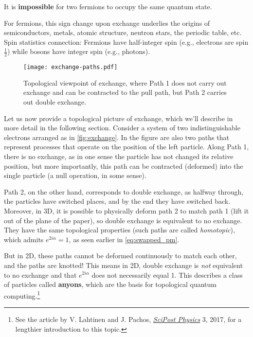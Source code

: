 \documentclass[12pt, english]{book}
\begin{document}
\begin{tcolorbox}[title = Pauli exclusion principle]
	It is \textbf{impossible} for two fermions to occupy the same quantum state.
\end{tcolorbox}

For fermions, this sign change upon exchange underlies the origins of semiconductors, metals, atomic structure, neutron stars, the periodic table, etc.
Spin statistics connection: Fermions have half-integer spin (e.g., electrons are spin $\frac{1}{2}$) while bosons have integer spin (e.g., photons).

\begin{figure}[!ht]
	\centering 
	\texttt{[image: exchange-paths.pdf]}
	\caption{Topological viewpoint of exchange, where Path 1 does not carry out exchange and can be contracted to the pull path, but Path 2 carries out double exchange.}
	\label{fig:exchange}
\end{figure}

Let us now provide a topological picture of exchange, which we'll describe in more detail in the following section.
Consider a system of two indistinguishable electrons arranged as in \autoref{fig:exchange}.
In the figure are also two paths that represent processes that operate on the position of the left particle.
Along Path 1, there is no exchange, as in one sense the particle has not changed its relative position, but more importantly, this path can be contracted (deformed) into the single particle (a null operation, in some sense).

Path 2, on the other hand, corresponds to double exchange, as halfway through, the particles have switched places, and by the end they have switched back.
Moreover, in 3D, it is possible to physically deform path 2 to match path 1 (lift it out of the plane of the paper), so double exchange is equivalent to no exchange.
They have the same topological properties (such paths are called \emph{homotopic}), which admits $e^{2 i \alpha} = 1$, as seen earlier in \autoref{eq:swapped_pm}.

But in 2D, these paths cannot be deformed continuously to match each other, and the paths are knotted!
This means in 2D, double exchange is \emph{not} equivalent to no exchange and that $e^{2 i \alpha}$ does not necessarily equal 1.
This describes a class of particles called \textbf{anyons}, which are the basis for topological quantum computing.\footnote{See the article by V. Lahtinen and J. Pachos, \href{https://arxiv.org/abs/1705.04103}{\emph{SciPost Physics}} 3, 2017, for a lengthier introduction to this topic.}
\end{document}
